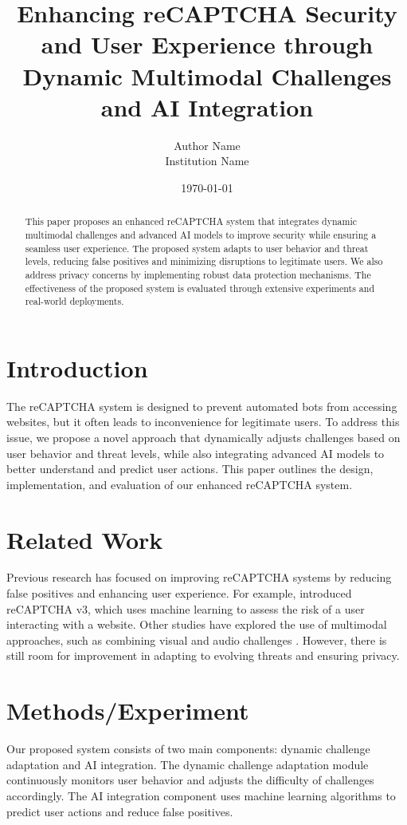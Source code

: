 \documentclass{article}
\title{Enhancing reCAPTCHA Security and User Experience through Dynamic Multimodal Challenges and AI Integration}
\author{Author Name \\ \small Institution Name}
\date{\today}
\begin{document}
\maketitle

\begin{abstract}
This paper proposes an enhanced reCAPTCHA system that integrates dynamic multimodal challenges and advanced AI models to improve security while ensuring a seamless user experience. The proposed system adapts to user behavior and threat levels, reducing false positives and minimizing disruptions to legitimate users. We also address privacy concerns by implementing robust data protection mechanisms. The effectiveness of the proposed system is evaluated through extensive experiments and real-world deployments.
\end{abstract}

\section{Introduction}
The reCAPTCHA system is designed to prevent automated bots from accessing websites, but it often leads to inconvenience for legitimate users. To address this issue, we propose a novel approach that dynamically adjusts challenges based on user behavior and threat levels, while also integrating advanced AI models to better understand and predict user actions. This paper outlines the design, implementation, and evaluation of our enhanced reCAPTCHA system.

\section{Related Work}
Previous research has focused on improving reCAPTCHA systems by reducing false positives and enhancing user experience. For example, \cite{reCaptchaV3} introduced reCAPTCHA v3, which uses machine learning to assess the risk of a user interacting with a website. Other studies have explored the use of multimodal approaches, such as combining visual and audio challenges \cite{multimodalReCaptcha}. However, there is still room for improvement in adapting to evolving threats and ensuring privacy.

\section{Methods/Experiment}
Our proposed system consists of two main components: dynamic challenge adaptation and AI integration. The dynamic challenge adaptation module continuously monitors user behavior and adjusts the difficulty of challenges accordingly. The AI integration component uses machine learning algorithms to predict user actions and reduce false positives.
\end{document}
